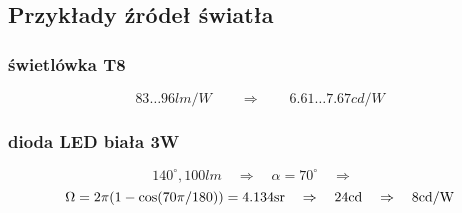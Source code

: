 \subsection{Przykłady źródeł światła}

\subsubsection{świetlówka T8}
$$83 \dots 96 lm/W \qquad\Rightarrow\qquad 6.61 \dots 7.67 cd/W$$

\subsubsection{dioda LED biała 3W}
$$140^\circ, 100lm \quad\Rightarrow\quad \alpha = 70^\circ \quad\Rightarrow\quad$$
$$\Omega = 2 \pi (1 - \cos (70\pi/180)) = 4.134 \rm sr \quad\Rightarrow\quad  24cd \quad\Rightarrow\quad 8 cd/W$$
